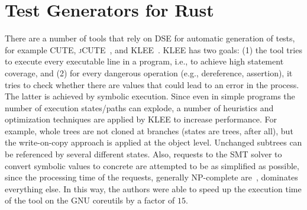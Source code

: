 \documentclass[paper=a4,%
  twoside,%
  BCOR4mm,%
  abstract=true,%
  toc=bibliography,%
  chapterprefix=true,%
  toc=bibliographynumbered,%
  open=right,%
  english,%
  pagesize=pdftex]{scrreprt}
\begin{document}
\section{Test Generators for Rust}

There are a number of tools that rely on \ac{DSE} for automatic generation of tests, for example \textsc{CUTE}, \textsc{jCUTE}~\cite{Sen2006}, and \textsc{KLEE}~\cite{cadar2008klee}. \textsc{KLEE} has two goals: (1) the tool tries to execute every executable line in a program, i.e., to achieve high statement coverage, and (2) for every dangerous operation (e.g., dereference, assertion), it tries to check whether there are values that could lead to an error in the process. The latter is achieved by symbolic execution. Since even in simple programs the number of execution states/paths can explode, a number of heuristics and optimization techniques are applied by \textsc{KLEE} to increase performance. For example, whole trees are not cloned at branches (states are trees, after all), but the write-on-copy approach is applied at the object level. Unchanged subtrees can be referenced by several different states. Also, requests to the \ac{SMT} solver to convert symbolic values to concrete are attempted to be as simplified as possible, since the processing time of the requests, generally NP-complete are~\cite{Lewis1983}, dominates everything else. In this way, the authors were able to speed up the execution time of the tool on the GNU coreutils by a factor of $15$.
\end{document}
